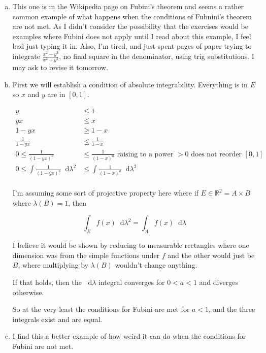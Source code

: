 \documentclass[11pt,oneside]{article}
\numberwithin{equation}{section}
\theoremstyle{definition}
\def\RR{\mathbb{R}}
\newcommand*\diff{\mathop{}\!\mathrm{d}}
\begin{document}
\begin{solution}
\begin{enumerate}[(a)]
\item
  This one is in the Wikipedia page on Fubini's theorem and seems a
  rather common example of what happens when the conditions of
  Fubnini's theorem are not met.  As I didn't consider the possibility
  that the exercises would be examples where Fubini does not apply
  until I read about this example, I feel bad just typing it in.
  Also, I'm tired, and just spent pages of paper trying to integrate
  $\frac{x^2 - y^2}{x^2+y^2}$, no final square in the denominator,
  using trig substitutions. I may ask to revise it tomorrow.
  
\item
  First we will establish a condition of absolute integrability.  Everything is in $E$ so
  $x$ and $y$ are in $[0,1]$.  

  \begin{align*}
    y & \leq 1 \\
    yx & \leq x \\
    1- yx & \geq 1 - x \\
    \frac{1}{1 - yx} & \leq \frac{1}{1-x}\\
    0 \leq  \frac{1}{(1 - yx)^a} & \leq \frac{1}{(1-x)^a} \textrm{ raising to a power } >0 \textrm{ does not reorder } [0,1] \\
    0 \leq \int  \frac{1}{(1 - yx)^a} \diff \lambda^2 & \leq \int \frac{1}{(1-x)^a} \diff \lambda^2 \\
  \end{align*}

  I'm assuming some sort of projective property here where if $E \in \RR^2 = A \times B$ where
  $\lambda(B) = 1$, then

  \[
  \int _ {E} f(x) \diff \lambda^2 = \int _A f(x) \diff \lambda
  \]

  I believe it would be shown by reducing to measurable rectangles where
  one dimension was from the simple functions under $f$ and the other would just
  be $B$, where multiplying by $\lambda(B)$ wouldn't change anything.  

  If that holds, then the $\diff \lambda$ integral converges for $0 < a < 1$ and
  diverges otherwise.

  So at the very least the conditions for Fubini are met for $a<1$, and the three
  integrals exist and are equal.  
\item
  I find this a better example of how weird it can do when the
  conditions for Fubini are not met.


\end{enumerate}
\end{solution}
\end{document}
